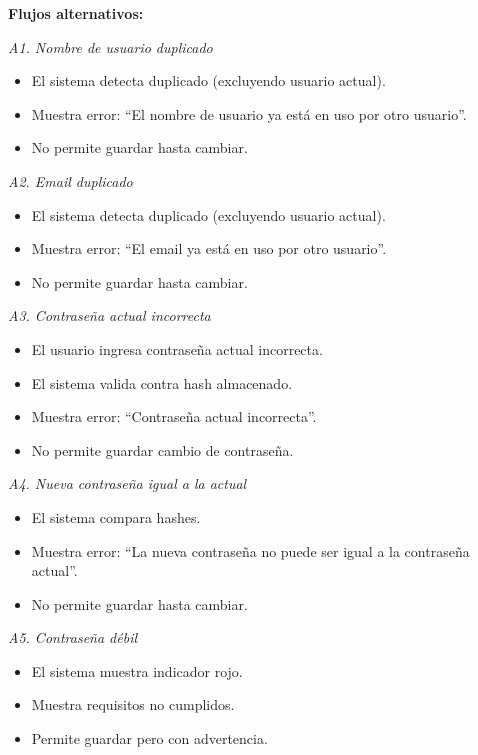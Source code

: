 \vspace{0.5em}
\noindent\textbf{Flujos alternativos:}

\vspace{0.3em}
\noindent\textit{A1. Nombre de usuario duplicado}
\begin{itemize}[nosep]
    \item El sistema detecta duplicado (excluyendo usuario actual).
    \item Muestra error: ``El nombre de usuario ya está en uso por otro usuario''.
    \item No permite guardar hasta cambiar.
\end{itemize}

\vspace{0.3em}
\noindent\textit{A2. Email duplicado}
\begin{itemize}[nosep]
    \item El sistema detecta duplicado (excluyendo usuario actual).
    \item Muestra error: ``El email ya está en uso por otro usuario''.
    \item No permite guardar hasta cambiar.
\end{itemize}

\vspace{0.3em}
\noindent\textit{A3. Contraseña actual incorrecta}
\begin{itemize}[nosep]
    \item El usuario ingresa contraseña actual incorrecta.
    \item El sistema valida contra hash almacenado.
    \item Muestra error: ``Contraseña actual incorrecta''.
    \item No permite guardar cambio de contraseña.
\end{itemize}

\vspace{0.3em}
\noindent\textit{A4. Nueva contraseña igual a la actual}
\begin{itemize}[nosep]
    \item El sistema compara hashes.
    \item Muestra error: ``La nueva contraseña no puede ser igual a la contraseña actual''.
    \item No permite guardar hasta cambiar.
\end{itemize}

\vspace{0.3em}
\noindent\textit{A5. Contraseña débil}
\begin{itemize}[nosep]
    \item El sistema muestra indicador rojo.
    \item Muestra requisitos no cumplidos.
    \item Permite guardar pero con advertencia.
\end{itemize}

